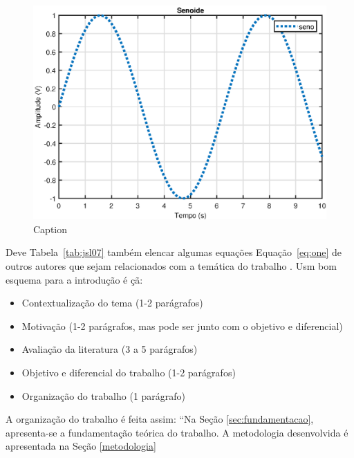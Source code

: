 \begin{figure}[H]
    \centering
    \includegraphics{teste.eps}
    \caption{Caption}
    \label{fig:enter-label}
\end{figure}

Deve Tabela~\ref{tab:jsl07} também elencar algumas equações Equação~\eqref{eq:one} de outros autores que sejam relacionados com a temática do trabalho \cite{INOUE2011}. 
Usm bom esquema para a introdução é \c{c}\~a:



\begin{itemize}
    \item Contextualização do tema (1-2 parágrafos) \cite{JESSICA2011}
    \item Motivação (1-2 parágrafos, mas pode ser junto com o objetivo e diferencial)
    \item Avaliação da literatura (3 a 5 parágrafos)
    \item Objetivo e diferencial do trabalho (1-2 parágrafos)
    \item Organização do trabalho (1 parágrafo) \cite{Joao2011}
\end{itemize}

A organização do trabalho é feita assim: “Na Seção \ref{sec:fundamentacao}, apresenta-se a fundamentação teórica do trabalho. A metodologia desenvolvida é apresentada na Seção \ref{metodologia}

